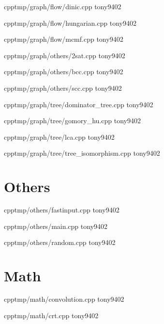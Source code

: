 {}
{}
{}
{cpp}{tmp/graph/flow/dinic.cpp}
{tony9402}



{}
{}
{}
{cpp}{tmp/graph/flow/hungarian.cpp}
{tony9402}



{}
{}
{}
{cpp}{tmp/graph/flow/mcmf.cpp}
{tony9402}



{}
{}
{}
{cpp}{tmp/graph/others/2sat.cpp}
{tony9402}



{}
{}
{}
{cpp}{tmp/graph/others/bcc.cpp}
{tony9402}



{}
{}
{}
{cpp}{tmp/graph/others/scc.cpp}
{tony9402}



{}
{}
{}
{cpp}{tmp/graph/tree/dominator_tree.cpp}
{tony9402}



{}
{}
{}
{cpp}{tmp/graph/tree/gomory_hu.cpp}
{tony9402}



{}
{}
{}
{cpp}{tmp/graph/tree/lca.cpp}
{tony9402}



{}
{}
{}
{cpp}{tmp/graph/tree/tree_isomorphism.cpp}
{tony9402}


\section{Others}


{}
{}
{}
{cpp}{tmp/others/fastinput.cpp}
{tony9402}



{}
{}
{}
{cpp}{tmp/others/main.cpp}
{tony9402}



{}
{}
{}
{cpp}{tmp/others/random.cpp}
{tony9402}


\section{Math}


{}
{}
{}
{cpp}{tmp/math/convolution.cpp}
{tony9402}



{}
{}
{}
{cpp}{tmp/math/crt.cpp}
{tony9402}



